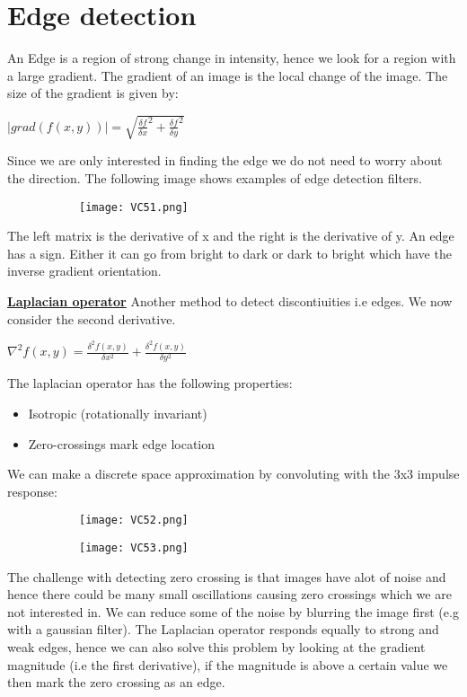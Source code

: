 \documentclass[8pt]{extreport}
\begin{document}
\section{Edge detection}

An Edge is a region of strong change in intensity, hence we look for a region with a large gradient. The gradient of an image is the local change of the image. The size of the gradient is given by:
\begin{center}
$|grad(f(x,y))| = \sqrt{\frac{\delta f}{\delta x}^2 + \frac{\delta f}{\delta y}^2}$
\end{center}
Since we are only interested in finding the edge we do not need to worry about the direction. The following image shows examples of edge detection filters.
 \begin{figure}[H]
\centering
\begin{subfigure}[b]{0.32\linewidth}
\texttt{[image: VC51.png]}
\end{subfigure}
\end{figure} 
The left matrix is the derivative of x and the right is the derivative of y.
An edge has a sign. Either it can go from bright to dark or dark to bright which have the inverse gradient orientation.

\underline{\textbf{Laplacian operator}} Another method to detect discontiuities i.e edges. We now consider the second derivative.
\begin{center}
$\nabla^2f(x,y) = \frac{\delta^2f(x,y)}{\delta x^2} + \frac{\delta^2 f(x,y)}{\delta y^2}$
\end{center}
The laplacian operator has the following properties:
\begin{itemize}
\item Isotropic (rotationally invariant)
\item Zero-crossings mark edge location
\end{itemize}
We can make a discrete space approximation by convoluting with the 3x3 impulse response:
 \begin{figure}[H]
\centering
\begin{subfigure}[b]{0.32\linewidth}
\texttt{[image: VC52.png]}
\end{subfigure}
\begin{subfigure}[b]{0.32\linewidth}
\texttt{[image: VC53.png]}
\end{subfigure}
\end{figure} 
The challenge with detecting zero crossing is that images have alot of noise and hence there could be many small oscillations causing zero crossings which we are not interested in. We can reduce some of the noise by blurring the image first (e.g with a gaussian filter).  The Laplacian operator responds equally to strong and weak edges, hence we can also solve this problem by looking at the gradient magnitude (i.e the first derivative), if the magnitude is above a certain value we then mark the zero crossing as an edge.\\
\end{document}
